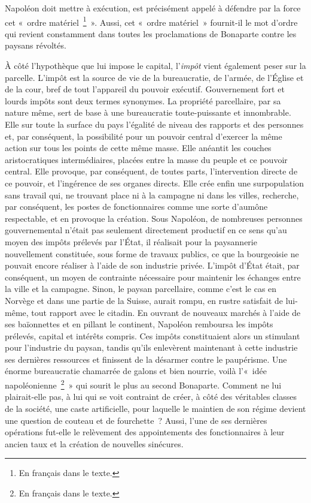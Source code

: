 \documentclass[french,twoside]{book} %
\begin{document}
Napoléon doit mettre à exécution, est précisément appelé à défendre par la force cet « ordre matériel \footnote{En français dans le texte.} ». Aussi, cet « ordre matériel » fournit-il le mot d’ordre qui revient constamment dans toutes les proclamations de Bonaparte contre les paysans révoltés.\par
À côté l’hypothèque que lui impose le capital, l’\emph{impôt} vient également peser sur la parcelle. L’impôt est la source de vie de la bureaucratie, de l’armée, de l’Église et de la cour, bref de tout l’appareil du pouvoir exécutif. Gouvernement fort et lourds impôts sont deux termes synonymes. La propriété parcellaire, par sa nature même, sert de base à une bureaucratie toute-puissante et innombrable. Elle sur toute la surface du pays l’égalité de niveau des rapports et des personnes et, par conséquent, la possibilité pour un pouvoir central d’exercer la même action sur tous les points de cette même masse. Elle anéantit les couches aristocratiques intermédiaires, placées entre la masse du peuple et ce pouvoir central. Elle provoque, par conséquent, de toutes parts, l’intervention directe de ce pouvoir, et l’ingérence de ses organes directs. Elle crée enfin une surpopulation sans travail qui, ne trouvant place ni à la campagne ni dans les villes, recherche, par conséquent, les postes de fonctionnaires comme une sorte d’aumône respectable, et en provoque la création. Sous Napoléon, de nombreuses personnes gouvernemental n’était pas seulement directement productif en ce sens qu’au moyen des impôts prélevés par l’État, il réalisait pour la paysannerie nouvellement constituée, sous forme de travaux publics, ce que la bourgeoisie ne pouvait encore réaliser à l’aide de son industrie privée. L’impôt d’État était, par conséquent, un moyen de contrainte nécessaire pour maintenir les échanges entre la ville et la campagne. Sinon, le paysan parcellaire, comme c’est le cas en Norvège et dans une partie de la Suisse, aurait rompu, en rustre satisfait de lui-même, tout rapport avec le citadin. En ouvrant de nouveaux marchés à l’aide de ses baïonnettes et en pillant le continent, Napoléon remboursa les impôts prélevés, capital et intérêts compris. Ces impôts constituaient alors un stimulant pour l’industrie du paysan, tandis qu’ils enlevèrent maintenant à cette industrie ses dernières ressources et finissent de la désarmer contre le paupérisme. Une énorme bureaucratie chamarrée de galons et bien nourrie, voilà l’« idée napoléonienne \footnote{En français dans le texte.} » qui sourit le plus au second Bonaparte. Comment ne lui plairait-elle pas, à lui qui se voit contraint de créer, à côté des véritables classes de la société, une caste artificielle, pour laquelle le maintien de son régime devient une question de couteau et de fourchette ? Aussi, l’une de ses dernières opérations fut-elle le relèvement des appointements des fonctionnaires à leur ancien taux et la création de nouvelles sinécures.\par
\end{document}
